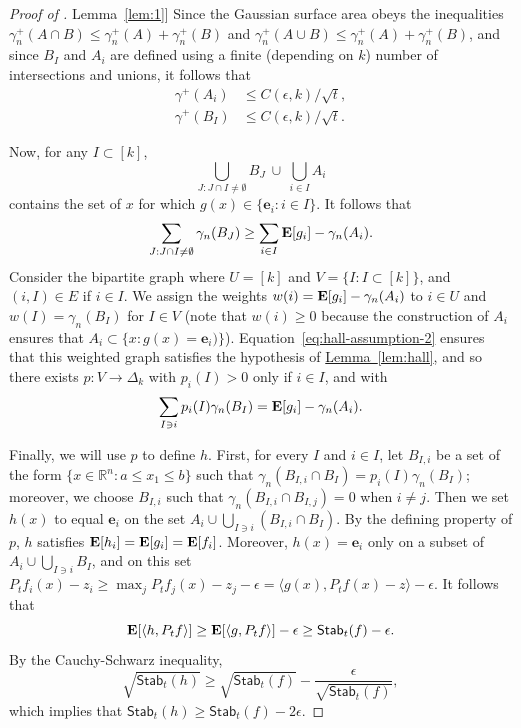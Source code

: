 \documentclass[11pt]{article}
\numberwithin{equation}{section}
\theoremstyle{definition}
\theoremstyle{plain}
\newcommand{\R}{\mathbb R}
\newcommand{\expref}[2]{\hyperref[#2]{#1~\ref{#2}}}
\newcommand{\E}{{\bf E}}
\newcommand{\Stab}{\mathsf{Stab}}
\begin{document}
\begin{proof}[Proof of \expref{Lemma}{lem:1}]
Since the Gaussian surface area obeys the inequalities $\gamma_n^+(A \cap B) \le \gamma_n^+(A) + \gamma_n^+(B)$
and $\gamma_n^+(A \cup B) \le \gamma_n^+(A) + \gamma_n^+(B)$, and since $B_I$ and $A_i$ are defined
using a finite (depending on $k$) number of intersections and unions, it follows that
\begin{equation}\label{eq:A-B-surface}
  \begin{aligned}
    \gamma^+(A_i) &\le C(\epsilon, k)/\sqrt t, \\
    \gamma^+(B_I) &\le C(\epsilon, k)/\sqrt t.
  \end{aligned}
\end{equation}

Now, for any $I \subset [k]$,
\[
  \bigcup_{J: J \cap I \ne \emptyset} B_J \:\cup\: \bigcup_{i \in I} A_i
\]
contains the set of $x$ for which $g(x) \in \{\mathbf{e}_i: i \in I\}$. It follows that
\begin{equation}\label{eq:hall-assumption-2}
  \sum_{J: J \cap I \ne \emptyset} \gamma_n(B_J)
  \ge \sum_{i \in I} \E [g_i] - \gamma_n(A_i).
\end{equation}
Consider the bipartite graph where $U = [k]$ and $V = \{I: I \subset [k]\}$, and $(i, I) \in E$ if $i \in I$.
We assign the weights $w(i) = \E[g_i] - \gamma_n(A_i)$ to $i \in U$ and $w(I) = \gamma_n(B_I)$ for $I \in V$
(note that $w(i) \ge 0$ because the construction of $A_i$ ensures that $A_i \subset \{x: g(x) = \mathbf{e}_i)\}$).
Equation~\eqref{eq:hall-assumption-2} ensures that this weighted graph satisfies the hypothesis of \expref{Lemma}{lem:hall},
and so there exists $p: V \to \Delta_k$ with $p_i(I) > 0$ only if $i \in I$, and with
\[
  \sum_{I \ni i} p_i(I) \gamma_n(B_I) = \E[g_i] - \gamma_n(A_i).
\]

Finally, we will use $p$ to define $h$. First, for every $I$ and $i \in I$, let $B_{I,i}$ be a set of the form
$\{x \in \R^n: a \le x_1 \le b\}$ such that $\gamma_n(B_{I,i} \cap B_I) = p_i(I) \gamma_n(B_I)$; moreover, we choose $B_{I,i}$
such that $\gamma_n(B_{I,i} \cap B_{I,j}) = 0$ when $i \ne j$. Then we
set $h(x)$ to equal $\mathbf{e}_i$ on the set $A_i \cup \bigcup_{I \ni i} (B_{I,i} \cap B_I)$. By the defining property of $p$,
$h$ satisfies $\E[h_i] = \E[g_i] = \E[f_i]$. Moreover, $h(x) = \mathbf{e}_i$ only on a subset of $A_i \cup \bigcup_{I \ni i} B_I$,
and on this set $P_t f_i(x) - z_i \ge \max_j P_t f_j(x) - z_j - \epsilon = \langle g(x), P_t f(x) - z\rangle - \epsilon$.
It follows that
\[
  \E[\langle h, P_t f\rangle] \ge \E[\langle g, P_t f\rangle] - \epsilon \ge \Stab_t(f) - \epsilon.
\]
By the Cauchy-Schwarz inequality,
\[
  \sqrt{\Stab_t(h)} \ge \sqrt{\Stab_t(f)} - \frac{\epsilon}{\sqrt{\Stab_t(f)}},
\]
which implies that $\Stab_t(h) \ge \Stab_t(f) - 2\epsilon$.


\end{proof}
\end{document}

